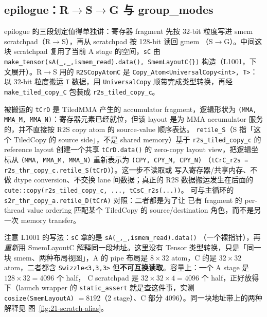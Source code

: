 \subsection{epilogue：R$\to$S$\to$G 与 group\_modes}

epilogue 的三段划定值得单独讲：寄存器 fragment 先按 32-bit 粒度写进
smem scratchpad（R$\to$S），再从 scratchpad 按 128-bit 读回 gmem
（S$\to$G）。中间这块 scratchpad 复用了当前 A stage 的空间，\texttt{sC}
由 \texttt{make\_\allowbreak{}tensor\allowbreak{}(sA(\_,\allowbreak{}\_,\allowbreak{}ismem\_\allowbreak{}read).\allowbreak{}data\allowbreak{}(),\allowbreak{} SmemLayoutC\{\})}
构造（L1001，下文展开）。R$\to$S 用的 \texttt{R2SCopyAtomC} 是
\texttt{Copy\_Atom<UniversalCopy<int>,\allowbreak{} T>}：以 32-bit 粒度搬运
\texttt{T} 数据，用 \texttt{UniversalCopy} 顺带完成类型转换，再经
\texttt{make\_tiled\_copy\_C} 包装成 \texttt{r2s\_tiled\_copy\_c}。

\begin{sloppypar}
被搬运的 \texttt{tCrD} 是 TiledMMA 产生的 accumulator fragment，逻辑形状为
\texttt{(MMA, MMA\_M, MMA\_N)}：寄存器元素已经就位，但该 layout 是为 MMA
accumulator 服务的，并不直接按 R2S copy atom 的 source-value 顺序表达。
\texttt{retile\_S}（S 指「这个 TiledCopy 的 source side」，不是 shared
memory）基于 \texttt{r2s\_tiled\_copy\_c} 的 reference layout 创建一个共享
\texttt{tCrD.data()} 的 zero-copy layout view，把逻辑坐标从
\texttt{(MMA, MMA\_M, MMA\_N)} 重新表示为 \texttt{(CPY, CPY\_M, CPY\_N)}
（\texttt{tCrC\_r2s = r2s\_thr\_copy\_c.retile\_S(tCrD)}）。这一步不读取或
写入寄存器/共享内存、不做 dtype conversion、不交换 lane 间数据；真正的
R2S 数据搬运发生在后面的
\texttt{cute::copy(r2s\_tiled\_copy\_c, ...,\allowbreak{} tCsC\_r2s(...))}。
可与主循环的 \texttt{s2r\_thr\_copy\_a.retile\_D(tCrA)} 对照：二者都是为了让
已有 fragment 的 per-thread value ordering 匹配某个 TiledCopy 的
source/destination 角色，而不是另一次 memory transfer。
\end{sloppypar}

\begin{sloppypar}
注意 L1001 的写法：\texttt{sC} 拿的是 \texttt{s\allowbreak{}A\allowbreak{}(\_\allowbreak{},\allowbreak{}\_\allowbreak{},\allowbreak{}ismem\_\allowbreak{}read).\allowbreak{}data\allowbreak{}()}
（一个裸指针），再\emph{重新}用 SmemLayoutC 解释同一段地址。这里没有 Tensor
类型转换，只是「同一块 smem、两种布局视图」，A 的 pipe 布局是
$8\times32$ atom，C 的是 $32\times32$ atom，二者都含 \texttt{Swizzle\allowbreak{}<3,\allowbreak{}3,\allowbreak{}3>}
但\textbf{不可互换读取}。容量上：一个 A stage 是 $128\times32=4096$ 个 half，
C scratchpad 是 $32\times32\times4=4096$ 个 half，正好放得下（launch wrapper
的 \texttt{static\_\allowbreak{}assert} 就是查这件事，实测 \texttt{cosize\allowbreak{}(Smem\allowbreak{}Layout\allowbreak{}A)}
$=8192$（2 stage）、C 部分 $4096$）。同一块地址带上的两种解释见
图~\ref{fig:21-scratch-alias}。
\end{sloppypar}

